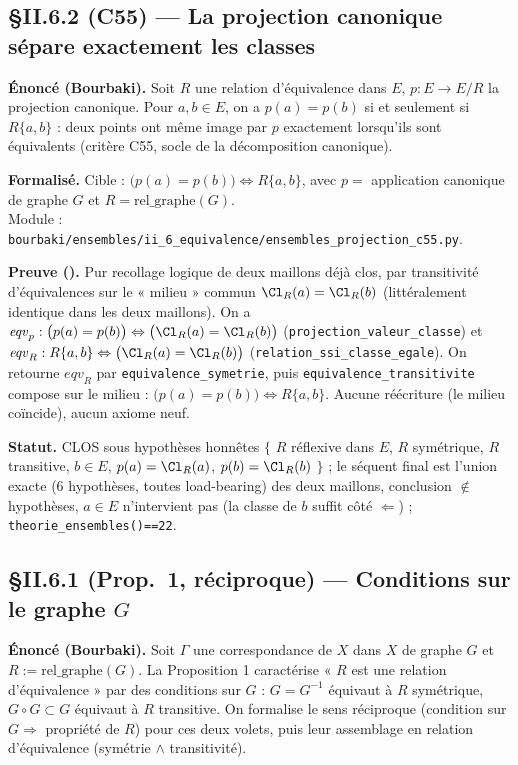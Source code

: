 
\subsection{§II.6.2 (C55) --- La projection canonique sépare exactement les classes}
\textbf{Énoncé (Bourbaki).} Soit $R$ une relation d'équivalence dans $E$, $p : E \to E/R$ la
projection canonique. Pour $a, b \in E$, on a $p(a) = p(b)$ si et seulement si $R\{a,b\}$ :
deux points ont même image par $p$ exactement lorsqu'ils sont équivalents (critère C55, socle
de la décomposition canonique).

\textbf{Formalisé.} Cible : $\bigl(p(a) = p(b)\bigr) \Leftrightarrow R\{a,b\}$, avec
$p = $ application canonique de graphe $G$ et $R = \mathrm{rel\_graphe}(G)$. \\
Module : \texttt{bourbaki/ensembles/ii\_6\_equivalence/ensembles\_projection\_c55.py}.

\textbf{Preuve (\Nstar).} Pur recollage logique de deux maillons déjà clos, par transitivité
d'équivalences sur le « milieu » commun $\Cl_R(a) = \Cl_R(b)$ (littéralement identique dans les
deux maillons). On a $\mathit{eqv}_p : \bigl(p(a)=p(b)\bigr) \Leftrightarrow \bigl(\Cl_R(a)=\Cl_R(b)\bigr)$
(\texttt{projection\_valeur\_classe}) et $\mathit{eqv}_R : R\{a,b\} \Leftrightarrow \bigl(\Cl_R(a)=\Cl_R(b)\bigr)$
(\texttt{relation\_ssi\_classe\_egale}). On retourne $\mathit{eqv}_R$ par \texttt{equivalence\_symetrie},
puis \texttt{equivalence\_transitivite} compose sur le milieu : $\bigl(p(a)=p(b)\bigr) \Leftrightarrow R\{a,b\}$.
Aucune réécriture (le milieu coïncide), aucun axiome neuf.

\textbf{Statut.} CLOS sous hypothèses honnêtes $\{$ $R$ réflexive dans $E$, $R$ symétrique, $R$
transitive, $b \in E$, $p(a) = \Cl_R(a)$, $p(b) = \Cl_R(b)$ $\}$ ; le séquent final est l'union exacte
(6 hypothèses, toutes load-bearing) des deux maillons, conclusion $\notin$ hypothèses, $a \in E$
n'intervient pas (la classe de $b$ suffit côté $\Leftarrow$) ; \texttt{theorie\_ensembles()==22}.

\subsection{§II.6.1 (Prop.\ 1, réciproque) --- Conditions sur le graphe $G$}
\textbf{Énoncé (Bourbaki).} Soit $\Gamma$ une correspondance de $X$ dans $X$ de graphe $G$ et
$R := \mathrm{rel\_graphe}(G)$. La Proposition 1 caractérise « $R$ est une relation d'équivalence »
par des conditions sur $G$ : $G = G^{-1}$ équivaut à $R$ symétrique, $G \circ G \subset G$ équivaut
à $R$ transitive. On formalise le sens réciproque (condition sur $G \Rightarrow$ propriété de $R$)
pour ces deux volets, puis leur assemblage en relation d'équivalence (symétrie $\wedge$ transitivité).

